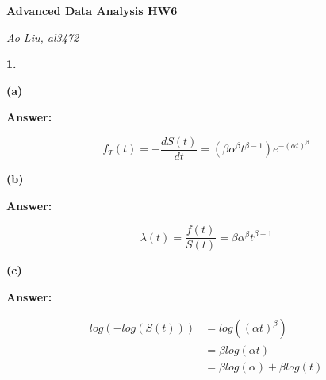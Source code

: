 \documentclass[letterpaper,11pt]{article}
\begin{document}
\begin{center}
	\textbf{\Huge{Advanced Data Analysis HW6}}
\end{center}

\begin{center}
	\textsl{Ao Liu, al3472}
\end{center}

\bigbreak
\bigbreak
\bigbreak



\begin{addmargin}[-2em]{0em}
  \large{\textbf{1. }}
\end{addmargin}
\textbf{}\par

\begin{addmargin}[-1.1em]{0em}
  \textbf{(a)}\par
\end{addmargin}
\textbf{}\par
\bigbreak
\begin{addmargin}[-0.5em]{0em}
  \textbf{Answer: }
\end{addmargin}

$$f_T(t) = -\frac{dS(t)}{dt} = (\beta\alpha^{\beta}t^{\beta-1})e^{-(\alpha t)^{\beta}}$$



\begin{addmargin}[-1.1em]{0em}
  \textbf{(b)}\par
\end{addmargin}
\textbf{}\par
\bigbreak
\begin{addmargin}[-0.5em]{0em}
  \textbf{Answer: }
\end{addmargin}

$$\lambda(t) = \frac{f(t)}{S(t)} = \beta\alpha^{\beta}t^{\beta-1}$$


\begin{addmargin}[-1.1em]{0em}
  \textbf{(c)}\par
\end{addmargin}
\textbf{}\par
\bigbreak
\begin{addmargin}[-0.5em]{0em}
  \textbf{Answer: }
\end{addmargin}

\begin{align}
log(-log(S(t))) & = log((\alpha t)^{\beta})\nonumber\\
& = \beta log(\alpha t) \nonumber\\
& = \beta log(\alpha) + \beta log(t) \nonumber
\end{align}
\end{document}
